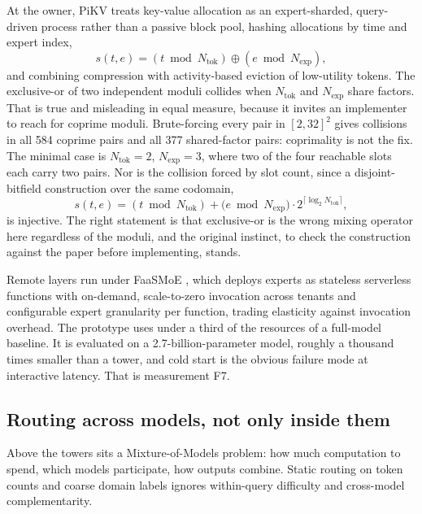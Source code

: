 \documentclass[11pt]{article}
\begin{document}
At the owner, PiKV \cite{liu2025pikv} treats key-value allocation as an expert-sharded, query-driven process rather than a passive block pool, hashing allocations by time and expert index,
\begin{equation}
s(t,e) = (t \bmod N_{\text{tok}}) \oplus (e \bmod N_{\text{exp}}),
\label{eq:pikv}
\end{equation}
and combining compression with activity-based eviction of low-utility tokens. The exclusive-or of two independent moduli collides when $N_{\text{tok}}$ and $N_{\text{exp}}$ share factors. That is true and misleading in equal measure, because it invites an implementer to reach for coprime moduli. Brute-forcing every pair in $[2,32]^2$ gives collisions in all 584 coprime pairs and all 377 shared-factor pairs: coprimality is not the fix. The minimal case is $N_{\text{tok}}=2$, $N_{\text{exp}}=3$, where two of the four reachable slots each carry two pairs. Nor is the collision forced by slot count, since a disjoint-bitfield construction over the same codomain,
\begin{equation}
s(t,e) = (t \bmod N_{\text{tok}}) + \bigl(e \bmod N_{\text{exp}}\bigr)\cdot 2^{\lceil \log_2 N_{\text{tok}}\rceil},
\label{eq:pikvfix}
\end{equation}
is injective. The right statement is that exclusive-or is the wrong mixing operator here regardless of the moduli, and the original instinct, to check the construction against the paper before implementing, stands.

Remote layers run under FaaSMoE \cite{faasmoe2026}, which deploys experts as stateless serverless functions with on-demand, scale-to-zero invocation across tenants and configurable expert granularity per function, trading elasticity against invocation overhead. The prototype uses under a third of the resources of a full-model baseline. It is evaluated on a 2.7-billion-parameter model, roughly a thousand times smaller than a tower, and cold start is the obvious failure mode at interactive latency. That is measurement F7.

\subsection{Routing across models, not only inside them}

Above the towers sits a Mixture-of-Models problem: how much computation to spend, which models participate, how outputs combine. Static routing on token counts and coarse domain labels ignores within-query difficulty and cross-model complementarity.
\end{document}
